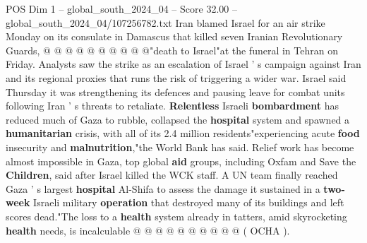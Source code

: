 \begin{textsample}{POS Dim 1 – global\_south\_2024\_04 – Score 32.00 – global\_south\_2024\_04/107256782.txt}
Iran blamed Israel for an air strike Monday on its consulate in Damascus that killed seven Iranian Revolutionary Guards, @ @ @ @ @ @ @ @ @ @"death to Israel"at the funeral in Tehran on Friday.
Analysts saw the strike as an escalation of Israel ' s campaign against Iran and its regional proxies that runs the risk of triggering a wider war.
Israel said Thursday it was strengthening its defences and pausing leave for combat units following Iran ' s threats to retaliate. \textbf{Relentless} Israeli \textbf{bombardment} has reduced much of Gaza to rubble, collapsed the \textbf{hospital} system and spawned a \textbf{humanitarian} crisis, with all of its 2.4 million residents"experiencing acute \textbf{food} insecurity and \textbf{malnutrition},"the World Bank has said.
Relief work has become almost impossible in Gaza, top global \textbf{aid} groups, including Oxfam and Save the \textbf{Children}, said after Israel killed the WCK staff.
A UN team finally reached Gaza ' s largest \textbf{hospital} Al-Shifa to assess the damage it sustained in a \textbf{two-week} Israeli military \textbf{operation} that destroyed many of its buildings and left scores dead."The loss to a \textbf{health} system already in tatters, amid skyrocketing \textbf{health} needs, is incalculable @ @ @ @ @ @ @ @ @ @ ( OCHA ).

\end{textsample}
